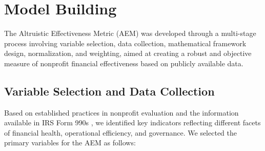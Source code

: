 \documentclass[12pt]{article}
\begin{document}
\section{Model Building} %
The Altruistic Effectiveness Metric (AEM) was developed through a multi-stage process involving variable selection, data collection, mathematical framework design, normalization, and weighting, aimed at creating a robust and objective measure of nonprofit financial effectiveness based on publicly available data.

\subsection{Variable Selection and Data Collection}
Based on established practices in nonprofit evaluation and the information available in IRS Form 990s \cite{bowman2011}, we identified key indicators reflecting different facets of financial health, operational efficiency, and governance. We selected the primary variables for the AEM as follows:
\end{document}

